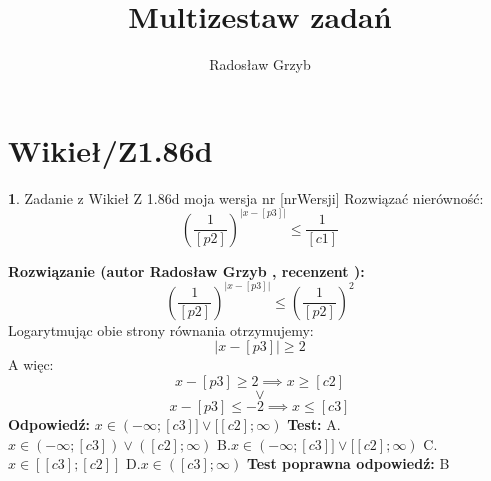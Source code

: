 \documentclass[12pt, a4paper]{article}
\title{Multizestaw zadań}
\author{Radosław Grzyb}
\date{}
\theoremstyle{definition} %
\newtheorem{zad}{}
\newcommand{\kategoria}[1]{\section{#1}} %
\newcommand{\zadStart}[1]{\begin{zad}#1\newline} %
\newcommand{\zadStop}{\end{zad}}   %
\newcommand{\rozwStart}[2]{\noindent \textbf{Rozwiązanie (autor #1 , recenzent #2): }\newline} %
\newcommand{\rozwStop}{\newline}                                            %
\newcommand{\odpStart}{\noindent \textbf{Odpowiedź:}\newline}    %
\newcommand{\odpStop}{\newline}                                             %
\newcommand{\testStart}{\noindent \textbf{Test:}\newline} %
\newcommand{\testStop}{\newline} %
\newcommand{\kluczStart}{\noindent \textbf{Test poprawna odpowiedź:}\newline} %
\newcommand{\kluczStop}{\newline} %
\begin{document}
\maketitle
\kategoria{Wikieł/Z1.86d}
\zadStart{Zadanie z Wikieł Z 1.86d moja wersja nr [nrWersji]}
Rozwiązać nierówność:
$$\left(\frac{1}{[p2]}\right)^{|x-[p3]|}\leq\frac{1}{[c1]}$$
\zadStop
\rozwStart{Radosław Grzyb}{}
$$\left(\frac{1}{[p2]}\right)^{|x-[p3]|}\leq\left(\frac{1}{[p2]}\right)^{2}$$
Logarytmując obie strony równania otrzymujemy:
$$|x-[p3]|\geq2$$
A więc:
$$x-[p3]\geq2\implies x\geq[c2]$$ $$\vee$$ $$x-[p3]\leq-2\implies x\leq[c3]$$
\rozwStop
\odpStart
$x \in (-\infty;[c3]] \vee [[c2];\infty)$
\odpStop
\testStart
A.$x \in (-\infty;[c3]) \vee ([c2];\infty)$
B.$x \in (-\infty;[c3]] \vee [[c2];\infty)$
C.$x \in [[c3];[c2]]$
D.$x \in ([c3];\infty)$
\testStop
\kluczStart
B
\kluczStop
\end{document}
